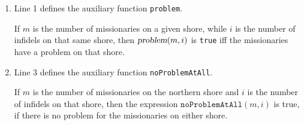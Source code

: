 \begin{enumerate}
\item Line 1 defines the auxiliary function \texttt{problem}.

      If $m$ is the number of missionaries on a given shore, while $i$ is the number of infidels on
      that same shore, then $\textsl{problem}(m, i)$ is \texttt{true} iff the missionaries have a problem on that
      shore.
\item Line 3 defines the auxiliary function \texttt{noProblemAtAll}.

      If $m$ is the number of missionaries on the northern shore and $i$ is the number of infidels on
      that shore, then the expression $\texttt{noProblemAtAll}(m, i)$ is true, if there is no problem
      for the missionaries on either shore.


\end{enumerate}
